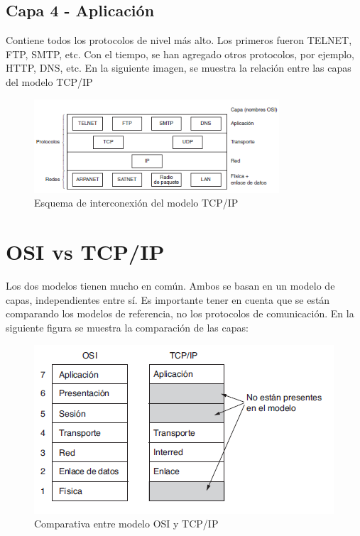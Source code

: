 \subsection{Capa 4 - Aplicación}
Contiene todos los protocolos de nivel más alto. Los primeros fueron TELNET, FTP, SMTP, etc. Con el tiempo, se han agregado otros protocolos, por ejemplo, HTTP, DNS, etc. 
En la siguiente imagen, se muestra la relación entre las capas del modelo TCP/IP
\vspace{-0.4cm}
\begin{figure}[ht]
	\centering
	\includegraphics[width=0.7\linewidth,height=3.5cm]{cap_ap_tcpip}
	\caption{Esquema de interconexión del modelo TCP/IP}
\end{figure}


\section{OSI vs TCP/IP }

Los dos modelos tienen mucho en común. Ambos se basan en un modelo de capas, independientes entre sí. Es importante tener en cuenta que se están comparando los modelos de referencia, no los protocolos de comunicación. En la siguiente figura se muestra la comparación de las capas:  

\begin{figure}[ht]
	\centering 
	\includegraphics{comptcposi}
	\caption{Comparativa entre modelo OSI y TCP/IP}
	\label{fig:comp_tcposi}
\end{figure}

